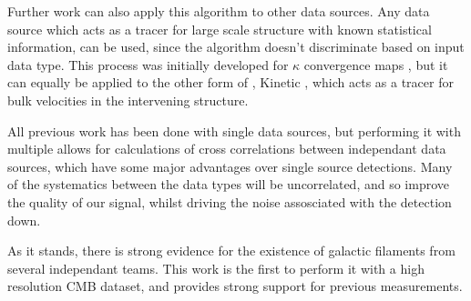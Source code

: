 \par Further work can also apply this algorithm to other data sources. Any data source which acts as a tracer for large scale structure with known statistical information, can be used, since the algorithm doesn't discriminate based on input data type. This process was initially developed for $\kappa$ convergence maps \citep{2016MNRAS.457.2391C}, but it can equally be applied to the other form of \sze, Kinetic \sze , which acts as a tracer for bulk velocities in the intervening structure. 

\par All previous work has been done with single data sources, but performing it with multiple allows for calculations of cross correlations between independant data sources, which have some major advantages over single source detections. Many of the systematics between the data types will be uncorrelated, and so improve the quality of our signal, whilst driving the noise assosciated with the detection down. 

\par As it stands, there is strong evidence for the existence of galactic filaments from several independant teams. This work is the first to perform it with a high resolution CMB dataset, and provides strong support for previous measurements. 